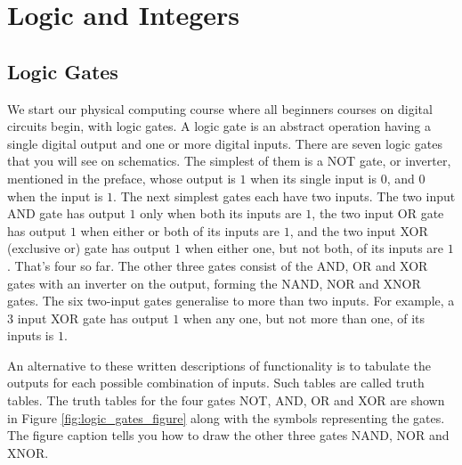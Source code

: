 \documentclass[../physical_computing.tex]{subfiles}
\begin{document}
\chapter{Logic and Integers}
\label{ch:arithmetic}

\section{Logic Gates}
\label{sec:logicgates}

We start our physical computing course where all beginners courses on digital circuits begin, with logic gates.
A logic gate is an abstract operation having a single digital output and one or more digital inputs. There are seven
logic gates that you will see on schematics. The simplest of them is a NOT gate, or inverter, mentioned in the preface,
whose output is $1$ when its single input is $0$, and $0$ when the input is $1$. The next simplest gates each have two inputs. The two input AND gate has output $1$ only when both its inputs are $1$, the two input OR gate has output $1$ when either or both of its inputs are $1$, and the two input XOR (exclusive or) gate has output $1$ when either one, but not both, of its inputs are $1$. That's four so far. The other three gates consist of the AND, OR and XOR gates with an inverter on the output, forming the NAND, NOR and XNOR gates. The six two-input gates generalise to more than two inputs. For example, a 3 input XOR gate has output $1$ when any one, but not more than one, of its inputs is $1$.

An alternative to these written descriptions of functionality is to tabulate the outputs for each possible combination of inputs. Such tables are called truth tables. The truth tables for the four gates NOT, AND, OR and XOR are shown in Figure \ref{fig:logic_gates_figure}
along with the symbols representing the gates. The figure caption tells you how to draw the other three gates NAND, NOR and XNOR. 
\end{document}
